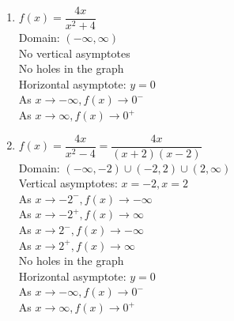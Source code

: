 \begin{multicols}{2}
\begin{enumerate}
\setcounter{enumi}{\value{HW}}

\item $f(x) = \dfrac{4x}{x^{2} + 4}$\\
Domain: $(-\infty,  \infty)$\\
No vertical asymptotes \\
No holes in the graph\\
Horizontal asymptote: $y = 0$ \\
As $x \rightarrow -\infty, f(x) \rightarrow 0^{-}$\\
As $x \rightarrow \infty, f(x) \rightarrow 0^{+}$\\


\vfill

\columnbreak

\item $f(x) = \dfrac{4x}{x^{2} -4} = \dfrac{4x}{(x + 2)(x - 2)}$\\
Domain: $(-\infty, -2) \cup (-2, 2) \cup (2, \infty)$\\
Vertical asymptotes: $x = -2, x = 2$\\
As $x \rightarrow -2^{-}, f(x) \rightarrow -\infty$\\
As $x \rightarrow -2^{+}, f(x) \rightarrow \infty$\\
As $x \rightarrow 2^{-}, f(x) \rightarrow -\infty$\\
As $x \rightarrow 2^{+}, f(x) \rightarrow \infty$\\
No holes in the graph\\
Horizontal asymptote: $y = 0$ \\
As $x \rightarrow -\infty, f(x) \rightarrow 0^{-}$\\
As $x \rightarrow \infty, f(x) \rightarrow 0^{+}$\\

\setcounter{HW}{\value{enumi}}
\end{enumerate}
\end{multicols}

